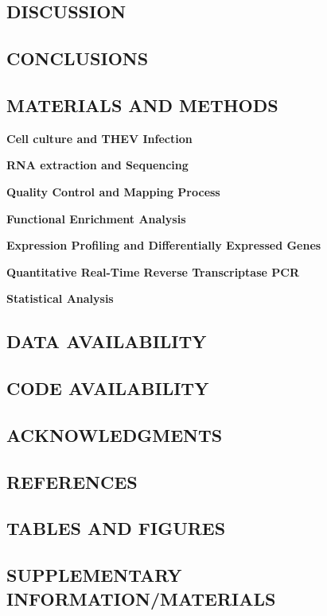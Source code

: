 \documentclass[
]{article}
\begin{document}
\newpage

\subsection{DISCUSSION}\label{discussion}

\newpage

\subsection{CONCLUSIONS}\label{conclusions}

\newpage

\subsection{MATERIALS AND METHODS}\label{materials-and-methods}

\textbf{Cell culture and THEV Infection}

\textbf{RNA extraction and Sequencing}

\textbf{Quality Control and Mapping Process}

\textbf{Functional Enrichment Analysis}

\textbf{Expression Profiling and Differentially Expressed Genes}

\textbf{Quantitative Real-Time Reverse Transcriptase PCR}

\textbf{Statistical Analysis} \newpage

\subsection{DATA AVAILABILITY}\label{data-availability}

\newpage

\subsection{CODE AVAILABILITY}\label{code-availability}

\newpage

\subsection{ACKNOWLEDGMENTS}\label{acknowledgments}

\newpage

\subsection{REFERENCES}\label{references}

\newpage

\subsection{TABLES AND FIGURES}\label{tables-and-figures}

\newpage

\subsection{SUPPLEMENTARY
INFORMATION/MATERIALS}\label{supplementary-informationmaterials}
\end{document}
